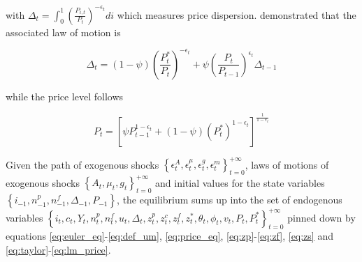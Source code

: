 with $\Delta_t = \int_{0}^{1} \left( \frac{P_{i,t}}{P_t}\right)^{-\epsilon_t} di$ which measures price dispersion. \citet{yun1996nominal} demonstrated that the associated law of motion is

\begin{equation}
\Delta_t = (1-\psi) \left( \frac{P_t^*}{P_t} \right)^{-\epsilon_t} + \psi \left( \frac{P_t}{P_{t-1}} \right)^{\epsilon_t} \Delta_{t-1}
\end{equation}

while the price level follows

\begin{equation}
P_t = \left[ \psi P_{t-1}^{1-\epsilon_t} + (1-\psi) \left( P_t^* \right)^{1-\epsilon_t} \right]^{\frac{1}{1-\epsilon_t}} \label{eq:lm_price}
\end{equation}

Given the path of exogenous shocks $\left\{ \epsilon_t^A, \epsilon_t^\mu, \epsilon_t^g, \epsilon_t^m \right\}_{t=0}^{+\infty}$, laws of motions of exogenous shocks $\left\{ A_t, \mu_t , g_t \right\}_{t=0}^{+\infty}$ and initial values for the state variables $\left\{ i_{-1}, n_{-1}^p, n_{-1}^f, \Delta_{-1}, P_{-1} \right\}$, the equilibrium sums up into the set of endogenous variables $\left\{ i_t, c_t, Y_t, n_t^p, n_t^f, u_t, \Delta_t, z_t^p, z_t^c, z_t^f, z_t^*, \theta_t, \phi_t, v_t, P_t, P_t^* \right\}_{t=0}^{+\infty}$ pinned down by equations \eqref{eq:euler_eq}-\eqref{eq:def_um}, \eqref{eq:price_eq}, \eqref{eq:zp}-\eqref{eq:zf}, \eqref{eq:zs} and \eqref{eq:taylor}-\eqref{eq:lm_price}. 